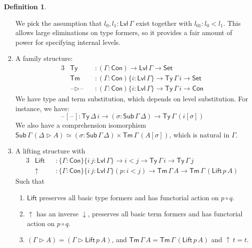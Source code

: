 \documentclass[a4paper,UKenglish,cleveref, autoref, thm-restate]{lipics-v2021}
\theoremstyle{remark}
\theoremstyle{definition}
\newtheorem{mydefinition}{Definition}
\newcommand{\Seti}{\mathsf{Set}}
\newcommand{\Con}{\mathsf{Con}}
\newcommand{\Ty}{\mathsf{Ty}}
\newcommand{\Tm}{\mathsf{Tm}}
\newcommand{\Sub}{\mathsf{Sub}}
\newcommand{\ext}{\triangleright}
\newcommand{\blank}{\mathord{\hspace{1pt}\text{--}\hspace{1pt}}}
\newcommand{\up}{{\uparrow}}
\newcommand{\down}{{\downarrow}}
\newcommand{\Lift}{\mathsf{Lift}}
\newcommand{\Lvl}{\mathsf{Lvl}}
\begin{document}
\begin{mydefinition}
\begin{enumerate}
  We pick the assumption that $l_0, l_1 : \Lvl\,\Gamma$ exist together with
  $l_{01} : l_0 < l_1$. This allows large eliminations on type formers, so it
  provides a fair amount of power for specifying internal levels.
\item
  A family structure:
  \begin{alignat*}{3}
    &\Ty &&: (\Gamma : \Con) \to \Lvl\,\Gamma \to \Seti\\
    &\Tm &&: (\Gamma : \Con)\{i : \Lvl\,\Gamma\} \to \Ty\,\Gamma\,i \to \Seti\\
    &\blank\ext\blank &&: (\Gamma : \Con)\{i : \Lvl\,\Gamma\} \to \Ty\,\Gamma\,i \to \Con
  \end{alignat*}
  We have type and term substitution, which depends on level substitution. For instance, we have:
  \[
    \blank[\blank] : \Ty\,\Delta\,i \to (\sigma : \Sub\,\Gamma\,\Delta) \to \Ty\,\Gamma\,(i[\sigma])
  \]
  We also have a comprehension isomorphism $\Sub\,\Gamma\,(\Delta \ext A) \simeq
  (\sigma : \Sub\,\Gamma\,\Delta)\times \Tm\,\Gamma\,(A[\sigma])$, which is
  natural in $\Gamma$.
\item A lifting structure with
  \begin{alignat*}{3}
    &\Lift &&: \{\Gamma : \Con\}\{i\,j : \Lvl\,\Gamma\} \to i < j \to \Ty\,\Gamma\,i \to \Ty\,\Gamma\,j\\
    &\up   &&: \{\Gamma : \Con\}\{i\,j : \Lvl\,\Gamma\}(p : i < j) \to \Tm\,\Gamma\,A \to \Tm\,\Gamma\,(\Lift\,p\,A)
  \end{alignat*}
  Such that
  \begin{enumerate}
    \item $\Lift$ preserves all basic type formers and has functorial action on $p \circ q$.
    \item $\up$ has an inverse $\down$, preserves all basic term formers and has functorial action on $p \circ q$.
    \item $(\Gamma \ext A) = (\Gamma \ext \Lift\,p\,A)$, and $\Tm\,\Gamma\,A = \Tm\,\Gamma\,(\Lift\,p\,A)$ and $\up\,t = t$.
  \end{enumerate}


\end{enumerate}
\end{mydefinition}
\end{document}
